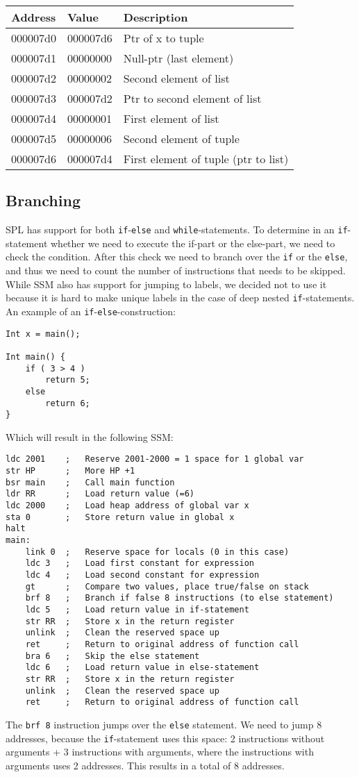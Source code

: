 \documentclass[a4paper]{article}
\begin{document}
\begin{tabular}{|l|l|l|}
	\hline
	Address & Value & Description \\
	\hline
	000007d0 & 000007d6 & Ptr of x to tuple \\
	000007d1 & 00000000 & Null-ptr (last element) \\
	000007d2 & 00000002 & Second element of list \\
	000007d3 & 000007d2 & Ptr to second element of list \\
	000007d4 & 00000001 & First element of list \\
	000007d5 & 00000006 & Second element of tuple \\
	000007d6 & 000007d4 & First element of tuple (ptr to list) \\
	\hline
\end{tabular}

\subsection{Branching}
SPL has support for both {\tt if}-{\tt else} and {\tt while}-statements. To determine in an {\tt if}-statement whether we need to execute the if-part or the else-part, we need to check the condition. After this check we need to branch over the {\tt if} or the {\tt else}, and thus we need to count the number of instructions that needs to be skipped. While SSM also has support for jumping to labels, we decided not to use it because it is hard to make unique labels in the case of deep nested {\tt if}-statements. An example of an {\tt if}-{\tt else}-construction:

\begin{lstlisting}
Int x = main();

Int main() {
	if ( 3 > 4 )
		return 5;
	else
		return 6;
}	
\end{lstlisting}
Which will result in the following SSM:
\begin{lstlisting}
ldc 2001	;	Reserve 2001-2000 = 1 space for 1 global var
str HP		;	More HP +1
bsr main	;	Call main function
ldr RR		;	Load return value (=6)
ldc 2000	;	Load heap address of global var x
sta 0		;	Store return value in global x
halt
main:		
	link 0	;	Reserve space for locals (0 in this case)
	ldc 3	;	Load first constant for expression
	ldc 4	;	Load second constant for expression
	gt		;	Compare two values, place true/false on stack
	brf 8	;	Branch if false 8 instructions (to else statement)
	ldc 5	;	Load return value in if-statement
	str RR	;	Store x in the return register
	unlink	;	Clean the reserved space up
	ret		;	Return to original address of function call
	bra 6	;	Skip the else statement
	ldc 6	;	Load return value in else-statement
	str RR	;	Store x in the return register
	unlink	;	Clean the reserved space up
	ret		;	Return to original address of function call
\end{lstlisting}
The {\tt brf 8} instruction jumps over the {\tt else} statement. We need to jump 8 addresses, because the {\tt if}-statement uses this space: 2 instructions without arguments + 3 instructions with arguments, where the instructions with arguments uses 2 addresses. This results in a total of 8 addresses.
\end{document}
